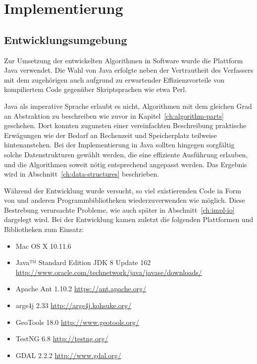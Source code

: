 \documentclass[../main/thesis.tex]{subfiles}
\begin{document}
\chapter{Implementierung}
\label{ch:impl}

\section{Entwicklungsumgebung}
\label{ch:impl-env}

Zur Umsetzung der entwickelten Algorithmen in Software wurde die Plattform Java verwendet.
Die Wahl von Java erfolgte neben der Vertrautheit des Verfassers mit dem zugehörigen  auch aufgrund zu erwartender Effizienzvorteile von kompiliertem Code gegenüber Skriptsprachen wie etwa Perl.

Java als imperative Sprache erlaubt es nicht, Algorithmen mit dem gleichen Grad an Abstraktion zu beschreiben wie zuvor in Kapitel~\ref{ch:algorithm-parts} geschehen.
Dort konnten zugunsten einer vereinfachten
Beschreibung praktische Erwägungen wie der Bedarf an Rechenzeit und Speicherplatz teilweise hintenanstehen.
Bei der Implementierung in Java sollten hingegen sorgfältig solche Datenstrukturen gewählt werden, die eine effiziente Ausführung erlauben, und die Algorithmen soweit nötig entsprechend angepasst werden.
Das Ergebnis wird in Abschnitt~\ref{ch:data-structures} beschrieben.

Während der Entwicklung wurde versucht, so viel existierenden Code in Form von  und anderen Programmbibliotheken wiederzuverwenden wie möglich.
Diese Bestrebung verursachte Probleme, wie auch später in Abschnitt~\ref{ch:impl-io} dargelegt wird.
Bei der Entwicklung kamen zuletzt die folgenden Plattformen und Bibliotheken zum Einsatz:

\begin{itemize}[nosep]
	\item Mac OS X 10.11.6
	\item Java™ Standard Edition JDK 8 Update 162\\ \url{http://www.oracle.com/technetwork/java/javase/downloads/}
	\item Apache Ant 1.10.2 \quad \url{https://ant.apache.org/}
	\item args4j 2.33 \quad \url{http://args4j.kohsuke.org/}
	\item GeoTools 18.0 \quad \url{http://www.geotools.org/}
	\item TestNG 6.8 \quad \url{http://testng.org/}
	\item GDAL 2.2.2 \quad \url{http://www.gdal.org/}
\end{itemize}
\end{document}
